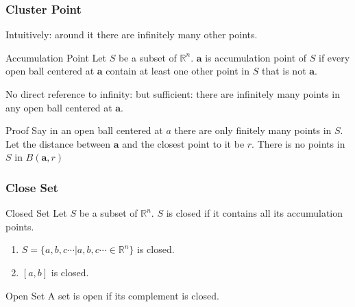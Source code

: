 \documentclass{beamer}
\begin{document}
\begin{frame}
\frametitle{Cluster Point}
Intuitively: around it there are infinitely many other points.
\begin{block}{Accumulation Point}
	Let $S$ be a subset of $\mathbb{R}^n$. 
	$\bm{a}$ is accumulation point of $S$ if every open ball centered at $\bm{a}$ contain at least one other point in $S$ that is not $\bm{a}$.
\end{block}

No direct reference to infinity: but sufficient: there are infinitely many points in any open ball centered at $\bm{a}$.

\begin{block}{Proof}
	Say in an open ball centered at $a$ there are only finitely many points in $S$. 
	Let the distance between $\bm{a}$ and the closest point to it be $r$.
There is no points in $S$ in $B(\bm{a},r)$

\begin{figure}
\end{figure}
\end{block}
\end{frame}

\begin{frame}
\frametitle{Close Set}

\begin{block}{Closed Set}
	Let $S$ be a subset of $\mathbb{R}^n$. 
	$S$ is closed if it contains all its accumulation points.
\end{block}

\begin{examples}
	\begin{enumerate}
		\item $S = \{a, b, c \cdots|a,b,c \cdots \in \mathbb{R}^n\}$ is closed.
		\item $[a,b]$ is closed.
	\end{enumerate}
\end{examples}

\begin{block}{ Open Set } 
	A set is open if its complement is closed.
\end{block}

\end{frame}
\end{document}
